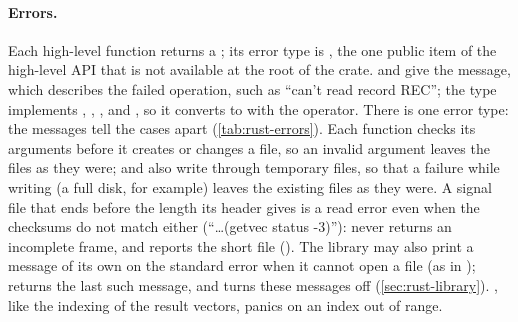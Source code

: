 \paragraph{Errors.} Each high-level function returns a ; its error type is
, the one public item of the high-level API that is not
available at the root of the crate.  and  give the
message, which describes the failed operation, such as ``can't read record REC''; the
type implements , , ,  and
, so it converts to  with the  operator. There is
one error type: the messages tell the cases apart (\cref{tab:rust-errors}). Each function
checks its arguments before it creates or changes a file, so an invalid argument leaves
the files as they were;  and  also write
through temporary files, so that a failure while writing (a full disk, for example)
leaves the existing files as they were. A signal file that ends before the length its
header gives is a read error even when the checksums do not match either (``\ldots(getvec
status -3)''):  never returns an incomplete frame, and
 reports the short file (). The library may also
print a message of its own on the standard error when it cannot open a file (as in
);  returns the last such
message, and  turns these messages off (\cref{sec:rust-library}). , like the indexing of the
result vectors, panics on an index out of range.

